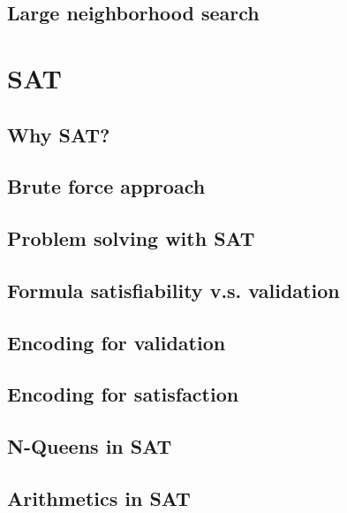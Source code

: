 \documentclass[12pt,a4paper,twoside]{book}
\begin{document}
\section{Large neighborhood search}

\label{s_4_12}

\chapter{SAT}

\label{c_5}

\section{Why SAT?}

\label{s_5_1}

\section{Brute force approach}

\label{s_5_2}

\section{Problem solving with SAT}

\label{s_5_3}

\section{Formula satisfiability v.s. validation}

\label{s_5_4}

\section{Encoding for validation}

\label{s_5_5}

\section{Encoding for satisfaction}

\label{s_5_6}

\section{N-Queens in SAT}

\label{s_5_7}

\section{Arithmetics in SAT}

\label{s_5_8}
\end{document}
